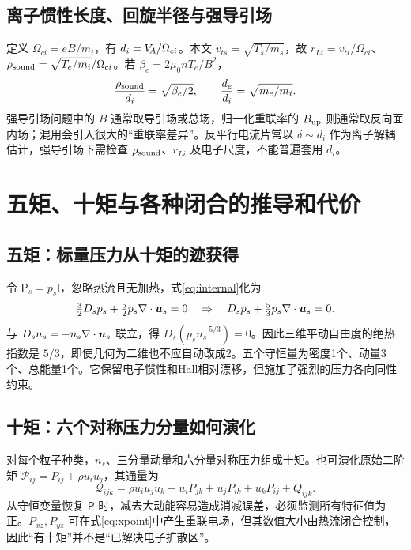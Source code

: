 \subsection{离子惯性长度、回旋半径与强导引场}
定义 $\Omega_{ci}=eB/m_i$，有 $d_i=V_{\!A}/\Omega_{ci}$。本文 $v_{ts}=\sqrt{T_s/m_s}$，故 $r_{Li}=v_{ti}/\Omega_{ci}$、$\rho_{\rm sound}=\sqrt{T_e/m_i}/\Omega_{ci}$。若 $\beta_e=2\mu_0nT_e/B^2$，
\begin{equation}{\rho_{\rm sound}\over d_i}=\sqrt{\beta_e/2},\qquad {d_e\over d_i}=\sqrt{m_e/m_i}.
\end{equation}
强导引场问题中的 $B$ 通常取导引场或总场，归一化重联率的 $B_{\rm up}$ 则通常取反向面内场；混用会引入很大的“重联率差异”。反平行电流片常以 $\delta\sim d_i$ 作为离子解耦估计，强导引场下需检查 $\rho_{\rm sound}$、$r_{Li}$ 及电子尺度，不能普遍套用 $d_i$。



\section{五矩、十矩与各种闭合的推导和代价}
\subsection{五矩：标量压力从十矩的迹获得}
令 $\mathsf P_s=p_s\mathsf I$，忽略热流且无加热，式\eqref{eq:internal}化为
\begin{equation}\tfrac32D_sp_s+\tfrac52p_s\nabla\cdot\bm{u}_s=0
\quad\Rightarrow\quad D_sp_s+\tfrac53p_s\nabla\cdot\bm{u}_s=0.
\end{equation}
与 $D_sn_s=-n_s\nabla\cdot\bm{u}_s$ 联立，得 $D_s(p_sn_s^{-5/3})=0$。因此三维平动自由度的绝热指数是 $5/3$，即使几何为二维也不应自动改成2。五个守恒量为密度1个、动量3个、总能量1个。它保留电子惯性和Hall相对漂移，但施加了强烈的压力各向同性约束。

\subsection{十矩：六个对称压力分量如何演化}
对每个粒子种类，$n_s$、三分量动量和六分量对称压力组成十矩。也可演化原始二阶矩 $\mathcal P_{ij}=P_{ij}+\rho u_iu_j$，其通量为
\begin{equation}\mathcal Q_{ijk}=\rho u_iu_ju_k+u_iP_{jk}+u_jP_{ik}+u_kP_{ij}+Q_{ijk}.
\end{equation}
从守恒变量恢复 $\mathsf P$ 时，减去大动能容易造成消减误差，必须监测所有特征值为正。$P_{xz},P_{yz}$ 可在式\eqref{eq:xpoint}中产生重联电场，但其数值大小由热流闭合控制，因此“有十矩”并不是“已解决电子扩散区”。\citep{Wang2015}

